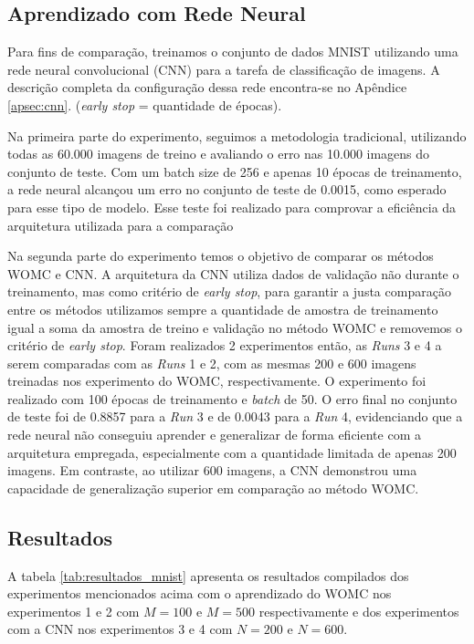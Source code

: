 \subsection{Aprendizado com Rede Neural}

Para fins de comparação, treinamos o conjunto de dados MNIST utilizando uma rede neural convolucional (CNN) para a tarefa de classificação de imagens. A descrição completa da configuração dessa rede encontra-se no Apêndice \ref{apsec:cnn}.  (\textit{early stop} = quantidade de épocas).

Na primeira parte do experimento, seguimos a metodologia tradicional, utilizando todas as 60.000 imagens de treino e avaliando o erro nas 10.000 imagens do conjunto de teste. Com um batch size de 256 e apenas 10 épocas de treinamento, a rede neural alcançou um erro no conjunto de teste de 0.0015, como esperado para esse tipo de modelo. Esse teste foi realizado para comprovar a eficiência da arquitetura utilizada para a comparação

Na segunda parte do experimento temos o objetivo de comparar os métodos WOMC e CNN. A arquitetura da CNN utiliza dados de validação não durante o treinamento, mas como critério de \textit{early stop}, para garantir a justa comparação entre os métodos utilizamos sempre a quantidade de amostra de treinamento igual a soma da amostra de treino e validação no método WOMC e removemos o critério de \textit{early stop}. Foram realizados 2 experimentos então, as \textit{Runs} 3 e 4 a serem comparadas com as \textit{Runs} 1 e 2, com as mesmas 200 e 600 imagens treinadas nos experimento do WOMC, respectivamente. O experimento foi realizado com 100 épocas de treinamento e \textit{batch} de 50. O erro final no conjunto de teste foi de 0.8857 para a \textit{Run} 3 e de 0.0043 para a \textit{Run} 4, evidenciando que a rede neural não conseguiu aprender e generalizar de forma eficiente com a arquitetura empregada, especialmente com a quantidade limitada de apenas 200 imagens. Em contraste, ao utilizar 600 imagens, a CNN demonstrou uma capacidade de generalização superior em comparação ao método WOMC.

\subsection{Resultados}

A tabela \ref{tab:resultados_mnist} apresenta os resultados compilados dos experimentos mencionados acima com o aprendizado do WOMC nos experimentos 1 e 2 com $M=100$ e $M=500$ respectivamente e dos experimentos com a CNN nos experimentos 3 e 4 com $N=200$ e $N=600$.

